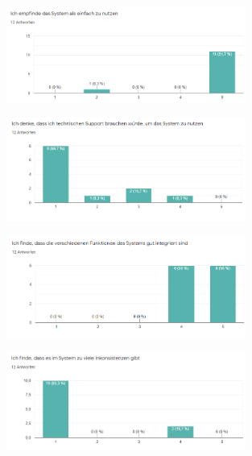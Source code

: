 \noChanges

\begin{figure}[H]
    \centering
    \includegraphics[width=0.7\textwidth]{media/survey/easyUsage.png}
\end{figure}

\noChanges

\begin{figure}[H]
    \centering
    \includegraphics[width=0.7\textwidth]{media/survey/technicalSupport.png}
\end{figure}

\noChanges

\begin{figure}[H]
    \centering
    \includegraphics[width=0.7\textwidth]{media/survey/integrity.png}
\end{figure}

\noChanges

\begin{figure}[H]
    \centering
    \includegraphics[width=0.7\textwidth]{media/survey/inconsistent.png}
\end{figure}

